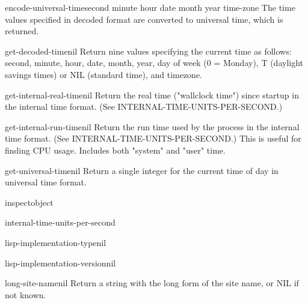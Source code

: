 \begin{function}{encode-universal-time}{second minute hour date month year \op time-zone}{}
  The time values specified in decoded format are converted to
   universal time, which is returned.
\end{function}

\begin{function}{get-decoded-time}{nil}{}
  Return nine values specifying the current time as follows:
   second, minute, hour, date, month, year, day of week (0 = Monday), T
   (daylight savings times) or NIL (standard time), and timezone.
\end{function}

\begin{function}{get-internal-real-time}{nil}{}
  Return the real time ("wallclock time") since startup in the internal
time format. (See INTERNAL-TIME-UNITS-PER-SECOND.)
\end{function}

\begin{function}{get-internal-run-time}{nil}{}
  Return the run time used by the process in the internal time format. (See
INTERNAL-TIME-UNITS-PER-SECOND.) This is useful for finding CPU usage.
Includes both "system" and "user" time.
\end{function}

\begin{function}{get-universal-time}{nil}{}
  Return a single integer for the current time of day in universal time
format.
\end{function}

\begin{function}{inspect}{object}{}
  
\end{function}

\begin{constant}{internal-time-units-per-second}{}{}
  
\end{constant}

\begin{function}{lisp-implementation-type}{nil}{}
  
\end{function}

\begin{function}{lisp-implementation-version}{nil}{}
  
\end{function}

\begin{function}{long-site-name}{nil}{}
  Return a string with the long form of the site name, or NIL if not known.
\end{function}


